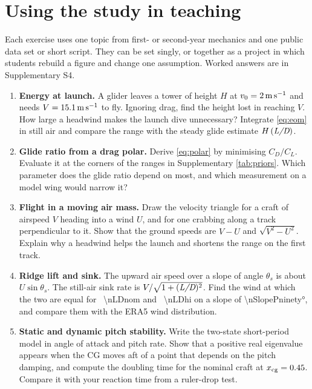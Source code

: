 \section{Using the study in teaching}
\label{sec:teaching}

Each exercise uses one topic from first- or second-year mechanics and one public data set
or short script.
They can be set singly, or together as a project in which students rebuild a figure and
change one assumption.
Worked answers are in Supplementary S4.

\begin{enumerate}
  \item \textbf{Energy at launch.}
  A glider leaves a tower of height \(H\) at \(v_0 = \SI{2}{\meter\per\second}\) and needs
  \(V = \SI{15.1}{\meter\per\second}\) to fly.
  Ignoring drag, find the height lost in reaching \(V\).
  How large a headwind makes the launch dive unnecessary?
  Integrate \cref{eq:eom} in still air and compare the range with the steady glide estimate
  \(H\,(\textit{L/D})\).

  \item \textbf{Glide ratio from a drag polar.}
  Derive \cref{eq:polar} by minimising \(C_D/C_L\).
  Evaluate it at the corners of the ranges in Supplementary \cref{tab:priors}.
  Which parameter does the glide ratio depend on most, and which measurement on a model
  wing would narrow it?

  \item \textbf{Flight in a moving air mass.}
  Draw the velocity triangle for a craft of airspeed \(V\) heading into a wind \(U\), and for
  one crabbing along a track perpendicular to it.
  Show that the ground speeds are \(V - U\) and \(\sqrt{V^2-U^2}\).
  Explain why a headwind helps the launch and shortens the range on the first track.

  \item \textbf{Ridge lift and sink.}
  The upward air speed over a slope of angle \(\theta_s\) is about \(U\sin\theta_s\).
  The still-air sink rate is \(V/\sqrt{1+(\textit{L/D})^2}\).
  Find the wind at which the two are equal for \LD~\num{\nLDnom} and \LD~\num{\nLDhi} on a
  slope of \ang{\nSlopePninety}, and compare them with the ERA5 wind distribution.

  \item \textbf{Static and dynamic pitch stability.}
  Write the two-state short-period model in angle of attack and pitch rate.
  Show that a positive real eigenvalue appears when the CG moves aft of a point that depends
  on the pitch damping, and compute the doubling time for the nominal craft at
  \(x_\mathrm{cg} = 0.45\).
  Compare it with your reaction time from a ruler-drop test.


\end{enumerate}
